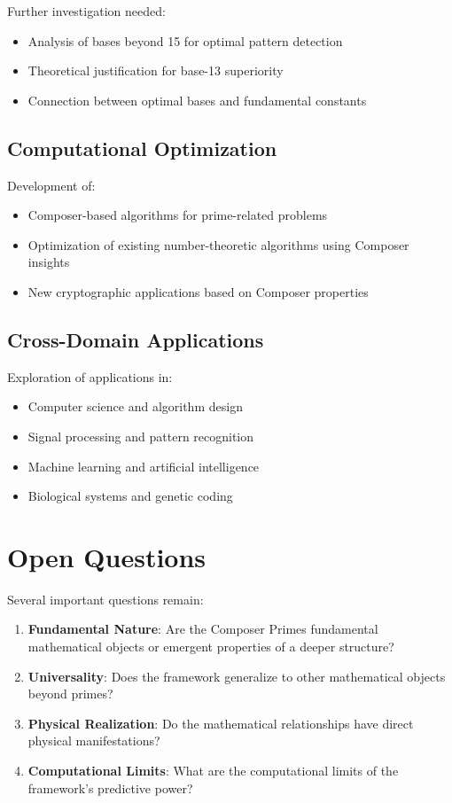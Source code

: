 \documentclass[12pt,a4paper]{report}
\begin{document}
Further investigation needed:
\begin{itemize}
\item Analysis of bases beyond 15 for optimal pattern detection
\item Theoretical justification for base-13 superiority
\item Connection between optimal bases and fundamental constants
\end{itemize}

\subsection{Computational Optimization}

Development of:
\begin{itemize}
\item Composer-based algorithms for prime-related problems
\item Optimization of existing number-theoretic algorithms using Composer insights
\item New cryptographic applications based on Composer properties
\end{itemize}

\subsection{Cross-Domain Applications}

Exploration of applications in:
\begin{itemize}
\item Computer science and algorithm design
\item Signal processing and pattern recognition
\item Machine learning and artificial intelligence
\item Biological systems and genetic coding
\end{itemize}

\section{Open Questions}

Several important questions remain:

\begin{enumerate}
\item \textbf{Fundamental Nature}: Are the Composer Primes fundamental mathematical objects or emergent properties of a deeper structure?
\item \textbf{Universality}: Does the framework generalize to other mathematical objects beyond primes?
\item \textbf{Physical Realization}: Do the mathematical relationships have direct physical manifestations?
\item \textbf{Computational Limits}: What are the computational limits of the framework's predictive power?
\end{enumerate}
\end{document}
